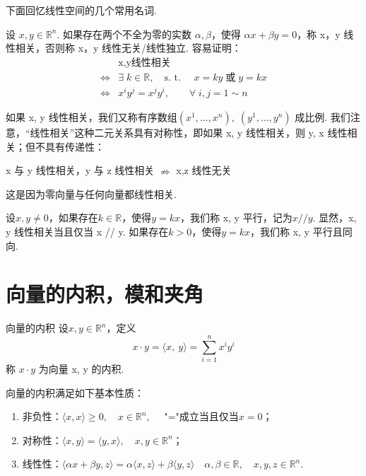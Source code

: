 \documentclass{article}
\begin{document}
\newpage

下面回忆线性空间的几个常用名词.

\vspace{10pt}

设 \(x,y \in \mathbb{R}^n\). 如果存在两个不全为零的实数 \(\alpha , \beta\)，使得 \(\alpha x +\beta y = 0\)，称 x，y 线性相关，否则称 x，y 线性无关/线性独立. 容易证明：
\begin{align*}
    & \text{x,y线性相关} \\
    \iff & \exists \;k \in \mathbb{R},\quad \text{s. t. } \quad x = ky\; \text{或}\; y = kx \\
    \iff & x^i y^j = x^j y^i,\qquad \forall \; i, j = 1 \sim n
\end{align*}

如果 x, y 线性相关，我们又称有序数组\((x^1,\dots ,x^n),\;(y^1,\dots ,y^n)\) 成比例. 我们注意，“线性相关”这种二元关系具有对称性，即如果 x, y 线性相关，则 y, x 线性相关；但不具有传递性：
\begin{center}
    x 与 y 线性相关，y 与 z 线性相关 \(\nRightarrow\) x,z 线性无关
\end{center}
这是因为零向量与任何向量都线性相关.

\vspace{20pt}

设\(x, y \neq 0\)，如果存在\(k \in \mathbb{R}\)，使得\(y = kx\)，我们称 x, y 平行，记为\(x // y\). 显然，x, y 线性相关当且仅当 x // y. 如果存在\(k > 0\)，使得\(y = kx\)，我们称 x, y 平行且同向.

\newpage

\section{向量的内积，模和夹角}
\begin{definition}{向量的内积}{}
    设\(x, y \in \mathbb{R}^n\)，定义
    \begin{equation*}
        x \cdot y = \langle x ,\ y \rangle =\sum_{i = 1}^n x^i y^i
    \end{equation*}
    称 \(x \cdot y\) 为向量 x, y 的内积.
\end{definition}

向量的内积满足如下基本性质：
\begin{enumerate}
    \item 非负性：\( \langle x, x \rangle \ge 0,\quad x \in \mathbb{R}^n, \quad \) "="成立当且仅当\(x = 0\)；
    \item 对称性：\( \langle x, y \rangle = \langle y, x \rangle ,\quad x, y \in \mathbb{R}^n\)；
    \item 线性性：\( \langle\alpha x + \beta y, z \rangle = \alpha \langle x, z \rangle + \beta \langle y, z \rangle \quad \alpha ,\beta \in \mathbb{R},\quad x,y,z \in \mathbb{R}^n\).
\end{enumerate}
\end{document}
